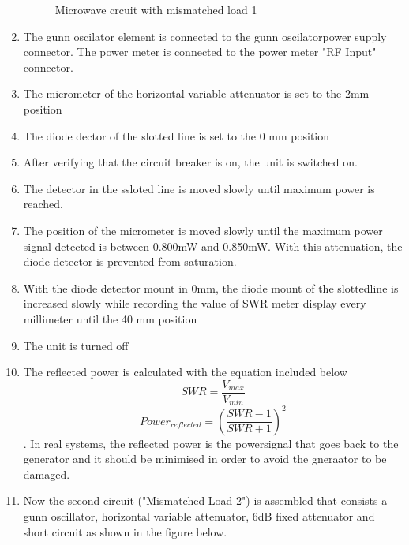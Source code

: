 \documentclass{report}
\begin{document}
\begin{enumerate}
\begin{figure}[H]
    \caption{Microwave crcuit with mismatched load 1}
    \end{figure}
    \item The gunn oscilator element is connected to the gunn oscilatorpower supply connector. The power meter is connected to the power meter "RF Input" connector.
    \item The micrometer of the horizontal variable attenuator is set to the 2mm position
    \item The diode dector of the slotted line is set to the 0 mm position
    \item After verifying that the circuit breaker is on, the unit is switched on.
    \item The detector in the ssloted line is moved slowly until maximum power is reached.
    \item The position of the micrometer is moved slowly until the maximum power signal detected is between 0.800mW and 0.850mW. With this attenuation, the diode detector is prevented from saturation.
    \item With the diode detector mount in 0mm, the diode mount of the slottedline is increased slowly while recording the value of SWR meter display every millimeter until the 40 mm position
    \item The unit is turned off
    \item The reflected power is calculated with the equation included below 
    \[SWR = \frac{V_{max}}{V_{min}}\]\[ Power_{reflected} = \left( \frac{SWR-1}{SWR+1} \right)^2 \] . In real systems, the reflected power is the powersignal that goes back to the generator and it should be minimised in order to avoid the gneraator to be damaged.
    \item Now the second circuit ("Mismatched Load 2") is assembled that consists a gunn oscillator, horizontal variable attenuator, 6dB fixed attenuator and short circuit as shown in the figure below.
    \begin{figure}[H]
\end{figure}
\end{enumerate}
\end{document}
